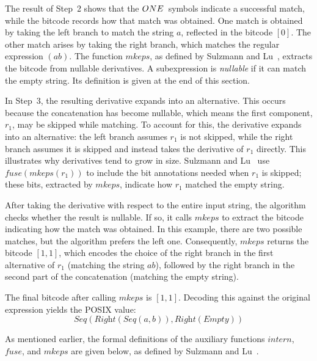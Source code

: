 \documentclass[12pt]{article}
\newcommand{\ONE}{\textbf{1}}
\newcommand{\fuse}{\textit{fuse}}
\newcommand{\mkeps}{\textit{mkeps}}
\newcommand{\intern}{\textit{intern}}
\newcommand{\Seq}{\textit{Seq}}
\newcommand{\Right}{\textit{Right}}
\newcommand{\Empty}{\textit{Empty}}
\begin{document}
\noindent The result of Step~2 shows that the $\\ONE\,$ symbols indicate a successful match,  
while the bitcode records how that match was obtained.  
One match is obtained by taking the left branch to match the string $a$, reflected in the bitcode $[0]$.  
The other match arises by taking the right branch, which matches the regular expression $(ab)$.  
The function $\mkeps$, as defined by Sulzmann and Lu~\cite{Sulzmann2014}, extracts the bitcode from nullable derivatives.  
A subexpression is \emph{nullable} if it can match the empty string.  
Its definition is given at the end of this section.  

In Step~3, the resulting derivative expands into an alternative.  
This occurs because the concatenation has become nullable, which means the first component, $r_1$, may be skipped while matching.  
To account for this, the derivative expands into an alternative: the left branch assumes $r_1$ is not skipped, 
while the right branch assumes it is skipped and instead takes the derivative of $r_1$ directly.  
This illustrates why derivatives tend to grow in size.  
Sulzmann and Lu~\cite{Sulzmann2014} use $\fuse(\mkeps(r_1))$ to include the bit annotations needed when $r_1$ is skipped; 
these bits, extracted by $\mkeps$, indicate how $r_1$ matched the empty string.  

After taking the derivative with respect to the entire input string, the algorithm checks whether the result is nullable.  
If so, it calls $\mkeps$ to extract the bitcode indicating how the match was obtained.  
In this example, there are two possible matches, but the algorithm prefers the left one.  
Consequently, $\mkeps$ returns the bitcode $[1,1]$, which encodes the choice of the right branch in the first alternative of $r_1$ 
(matching the string $ab$), followed by the right branch in the second part of the concatenation (matching the empty string).  

The final bitcode after calling $\mkeps$ is $[1,1]$.  
Decoding this against the original expression yields the POSIX value:
\[
\Seq(\Right(\Seq(a, b)), \Right(\Empty))
\]

As mentioned earlier, the formal definitions of the auxiliary functions $\intern$, $\fuse$, and $\mkeps$ are given below, 
as defined by Sulzmann and Lu~\cite{Sulzmann2014}.
\end{document}
